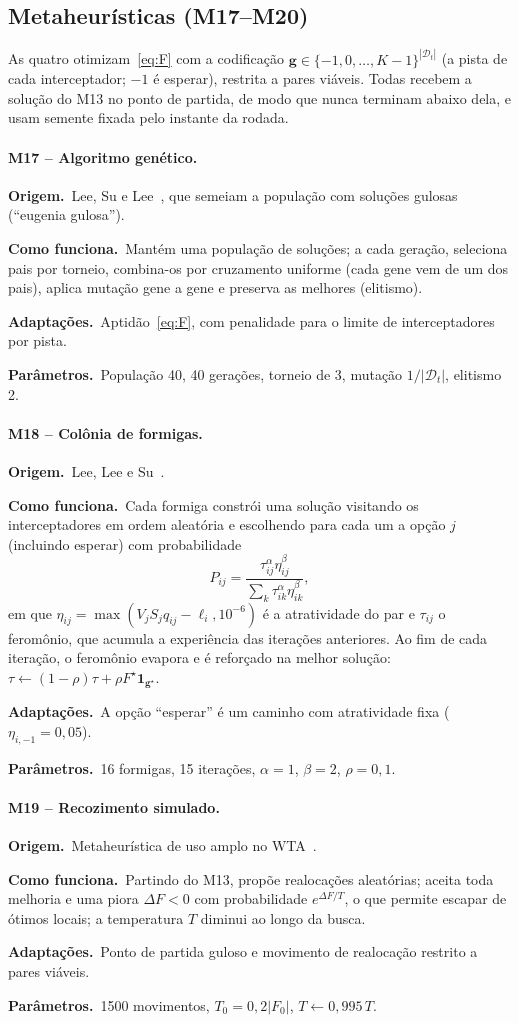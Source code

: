 \documentclass[11pt,a4paper]{article}
\newcommand{\orig}{\par\noindent\textbf{Origem.}~}
\newcommand{\func}{\par\noindent\textbf{Como funciona.}~}
\newcommand{\adap}{\par\noindent\textbf{Adaptações.}~}
\newcommand{\parm}{\par\noindent\textbf{Parâmetros.}~}
\begin{document}
\subsection{Metaheurísticas (M17--M20)}

As quatro otimizam~\eqref{eq:F} com a codificação $\bm{g}\in\{-1,0,\dots,K-1\}^{|\mathcal{D}_t|}$ (a pista de cada
interceptador; $-1$ é esperar), restrita a pares viáveis. Todas recebem a solução do M13 no ponto de partida, de modo
que nunca terminam abaixo dela, e usam semente fixada pelo instante da rodada.

\paragraph{M17 -- Algoritmo genético.}
\orig Lee, Su e Lee~\cite{lee2003ga}, que semeiam a população com soluções gulosas (``eugenia gulosa'').
\func Mantém uma população de soluções; a cada geração, seleciona pais por torneio, combina-os por cruzamento uniforme
(cada gene vem de um dos pais), aplica mutação gene a gene e preserva as melhores (elitismo).
\adap Aptidão~\eqref{eq:F}, com penalidade para o limite de interceptadores por pista.
\parm População 40, 40 gerações, torneio de 3, mutação $1/|\mathcal{D}_t|$, elitismo 2.

\paragraph{M18 -- Colônia de formigas.}
\orig Lee, Lee e Su~\cite{lee2002aco}.
\func Cada formiga constrói uma solução visitando os interceptadores em ordem aleatória e escolhendo para cada um a opção
$j$ (incluindo esperar) com probabilidade
\begin{equation}
  P_{ij}=\frac{\tau_{ij}^{\alpha}\eta_{ij}^{\beta}}{\sum_{k}\tau_{ik}^{\alpha}\eta_{ik}^{\beta}},
\end{equation}
em que $\eta_{ij}=\max(V_jS_jq_{ij}-\ell_i,10^{-6})$ é a atratividade do par e $\tau_{ij}$ o feromônio, que acumula a
experiência das iterações anteriores. Ao fim de cada iteração, o feromônio evapora e é reforçado na melhor solução:
$\tau\leftarrow(1-\rho)\tau+\rho F^\star\mathbf{1}_{\bm{g}^\star}$.
\adap A opção ``esperar'' é um caminho com atratividade fixa ($\eta_{i,-1}=0{,}05$).
\parm 16 formigas, 15 iterações, $\alpha=1$, $\beta=2$, $\rho=0{,}1$.

\paragraph{M19 -- Recozimento simulado.}
\orig Metaheurística de uso amplo no WTA~\cite{kline2019}.
\func Partindo do M13, propõe realocações aleatórias; aceita toda melhoria e uma piora $\Delta F<0$ com probabilidade
$e^{\Delta F/T}$, o que permite escapar de ótimos locais; a temperatura $T$ diminui ao longo da busca.
\adap Ponto de partida guloso e movimento de realocação restrito a pares viáveis.
\parm 1500 movimentos, $T_0=0{,}2|F_0|$, $T\leftarrow0{,}995\,T$.
\end{document}
